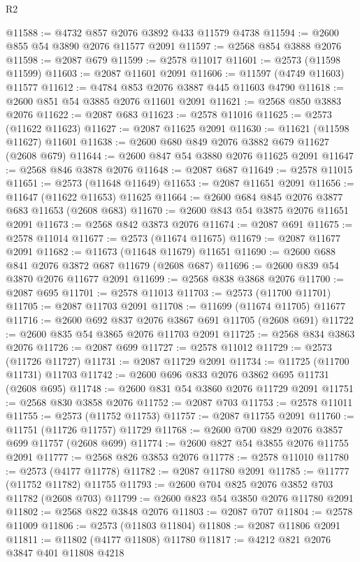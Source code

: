 \begin{lexlean}{R2}
\begin{coremodule}
@11588 := @4732 @857 @2076 @3892 @433 @11579 @4738
@11594 := @2600 @855 @54 @3890 @2076 @11577 @2091
@11597 := @2568 @854 @3888 @2076
@11598 := @2087 @679
@11599 := @2578 @11017
@11601 := @2573 (@11598 @11599)
@11603 := @2087 @11601 @2091
@11606 := @11597 (@4749 @11603) @11577
@11612 := @4784 @853 @2076 @3887 @445 @11603 @4790
@11618 := @2600 @851 @54 @3885 @2076 @11601 @2091
@11621 := @2568 @850 @3883 @2076
@11622 := @2087 @683
@11623 := @2578 @11016
@11625 := @2573 (@11622 @11623)
@11627 := @2087 @11625 @2091
@11630 := @11621 (@11598 @11627) @11601
@11638 := @2600 @680 @849 @2076 @3882 @679 @11627 (@2608 @679)
@11644 := @2600 @847 @54 @3880 @2076 @11625 @2091
@11647 := @2568 @846 @3878 @2076
@11648 := @2087 @687
@11649 := @2578 @11015
@11651 := @2573 (@11648 @11649)
@11653 := @2087 @11651 @2091
@11656 := @11647 (@11622 @11653) @11625
@11664 := @2600 @684 @845 @2076 @3877 @683 @11653 (@2608 @683)
@11670 := @2600 @843 @54 @3875 @2076 @11651 @2091
@11673 := @2568 @842 @3873 @2076
@11674 := @2087 @691
@11675 := @2578 @11014
@11677 := @2573 (@11674 @11675)
@11679 := @2087 @11677 @2091
@11682 := @11673 (@11648 @11679) @11651
@11690 := @2600 @688 @841 @2076 @3872 @687 @11679 (@2608 @687)
@11696 := @2600 @839 @54 @3870 @2076 @11677 @2091
@11699 := @2568 @838 @3868 @2076
@11700 := @2087 @695
@11701 := @2578 @11013
@11703 := @2573 (@11700 @11701)
@11705 := @2087 @11703 @2091
@11708 := @11699 (@11674 @11705) @11677
@11716 := @2600 @692 @837 @2076 @3867 @691 @11705 (@2608 @691)
@11722 := @2600 @835 @54 @3865 @2076 @11703 @2091
@11725 := @2568 @834 @3863 @2076
@11726 := @2087 @699
@11727 := @2578 @11012
@11729 := @2573 (@11726 @11727)
@11731 := @2087 @11729 @2091
@11734 := @11725 (@11700 @11731) @11703
@11742 := @2600 @696 @833 @2076 @3862 @695 @11731 (@2608 @695)
@11748 := @2600 @831 @54 @3860 @2076 @11729 @2091
@11751 := @2568 @830 @3858 @2076
@11752 := @2087 @703
@11753 := @2578 @11011
@11755 := @2573 (@11752 @11753)
@11757 := @2087 @11755 @2091
@11760 := @11751 (@11726 @11757) @11729
@11768 := @2600 @700 @829 @2076 @3857 @699 @11757 (@2608 @699)
@11774 := @2600 @827 @54 @3855 @2076 @11755 @2091
@11777 := @2568 @826 @3853 @2076
@11778 := @2578 @11010
@11780 := @2573 (@4177 @11778)
@11782 := @2087 @11780 @2091
@11785 := @11777 (@11752 @11782) @11755
@11793 := @2600 @704 @825 @2076 @3852 @703 @11782 (@2608 @703)
@11799 := @2600 @823 @54 @3850 @2076 @11780 @2091
@11802 := @2568 @822 @3848 @2076
@11803 := @2087 @707
@11804 := @2578 @11009
@11806 := @2573 (@11803 @11804)
@11808 := @2087 @11806 @2091
@11811 := @11802 (@4177 @11808) @11780
@11817 := @4212 @821 @2076 @3847 @401 @11808 @4218

\end{coremodule}
\end{lexlean}
